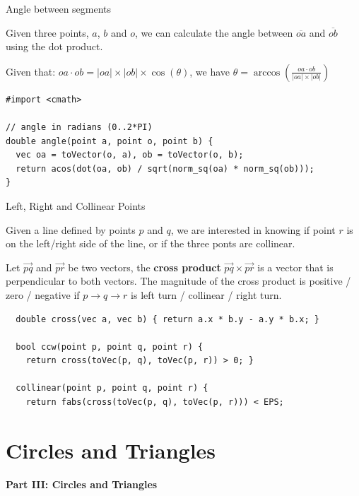 \begin{frame}[fragile]{Angle between segments}

Given three points, $a$, $b$ and $o$, we can calculate
the angle between $\overline{oa}$ and $\overline{ob}$ using the dot product.\medskip

Given that: $oa\cdot ob = |oa|\times|ob|\times\cos(\theta)$, we have $\theta = \arccos(\frac{oa\cdot ob}{|oa|\times|ob|})$\bigskip

{\smaller

\begin{exampleblock}{}
\begin{verbatim}
#import <cmath>

// angle in radians (0..2*PI)
double angle(point a, point o, point b) {
  vec oa = toVector(o, a), ob = toVector(o, b);
  return acos(dot(oa, ob) / sqrt(norm_sq(oa) * norm_sq(ob)));
}
\end{verbatim}
\end{exampleblock}}
\end{frame}

\begin{frame}[fragile]{Left, Right and Collinear Points}

  Given a line defined by points $p$ and $q$, we are interested in knowing if point $r$ is on the left/right side of the line, or if the three ponts are collinear.\bigskip

  Let $\vec{pq}$ and $\vec{pr}$ be two vectors, the {\bf cross product} $\vec{pq} \times \vec{pr}$ is a vector that is perpendicular to both vectors. The  magnitude of the cross product is positive / zero / negative if $p \to q \to r$ is left turn / collinear / right turn.

  {\smaller
  \begin{exampleblock}{}
  \begin{verbatim}
  double cross(vec a, vec b) { return a.x * b.y - a.y * b.x; }

  bool ccw(point p, point q, point r) {
    return cross(toVec(p, q), toVec(p, r)) > 0; }

  collinear(point p, point q, point r) {
    return fabs(cross(toVec(p, q), toVec(p, r))) < EPS;
  \end{verbatim}
  \end{exampleblock}
  }
\end{frame}

\section{Circles and Triangles}
\begin{frame}
  \centering
  {\bf Part III: Circles and Triangles}
\end{frame}

